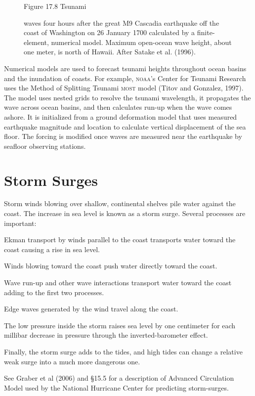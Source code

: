 \begin{figure}[t!]
\footnotesize
Figure 17.8 Tsunami \rule{0mm}{3ex}waves
four hours after the great M9 Cascadia earthquake off the coast of
Washington on 26 January 1700 calculated by a finite-element,
numerical model. Maximum open-ocean wave height, about one meter, is
north of Hawaii. After Satake et al. (1996).
\label{fig:tsunamiwave}

\vspace{-3ex}
\end{figure}

Numerical models are used to forecast tsunami heights throughout ocean
basins and the inundation of coasts. For example, \textsc{noaa}'s
Center for Tsunami Research uses the Method of Splitting Tsunami
\textsc{most} model (Titov and Gonzalez, 1997). The model uses nested
grids to resolve the tsunami wavelength, it propagates the wave across
ocean basins, and then calculates run-up when the wave comes
ashore. It is initialized from a ground deformation model that uses
measured earthquake magnitude and location to calculate vertical
displacement of the sea floor. The forcing is modified once waves are
measured near the earthquake by seafloor observing stations.

\section{Storm Surges}
Storm winds blowing over shallow, continental
shelves pile water against the coast. The increase in sea level is
known as a storm surge. Several processes are important:
\begin{enumerate}
\vitem Ekman transport by winds parallel to the
coast transports water toward the coast causing a rise in sea level.

\vitem Winds blowing toward the coast push water directly toward the
coast.

\vitem Wave run-up and other wave interactions
transport water toward the
coast adding to the first two processes.

\vitem Edge waves generated by the wind travel along the coast.

\vitem The low pressure inside the storm raises sea level by one
centimeter for each millibar decrease in pressure through the
inverted-barometer effect.

\vitem Finally, the storm surge adds to the tides, and high tides can
change a relative weak surge into a much more dangerous one.
\end{enumerate}
See Graber et al (2006) and \S 15.5 for a description of Advanced
Circulation Model used by the National Hurricane Center for predicting
storm-surges.

